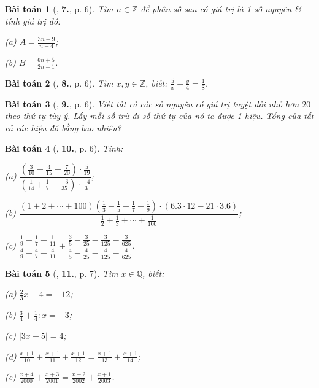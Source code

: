 \documentclass{article}
\numberwithin{equation}{section}
\newtheorem{baitoan}{Bài toán}[section]
\begin{document}
\begin{baitoan}[\cite{Binh_Toan_7_tap_1}, \textbf{7.}, p. 6]
	Tìm $n\in\mathbb{Z}$ để phân số sau có giá trị là 1 số nguyên \& tính giá trị đó:
	\begin{enumerate*}
		\item[(a)] $A = \frac{3n + 9}{n - 4}$;
		\item[(b)] $B = \frac{6n + 5}{2n - 1}$.
	\end{enumerate*}
\end{baitoan}

\begin{baitoan}[\cite{Binh_Toan_7_tap_1}, \textbf{8.}, p. 6]
	Tìm $x,y\in\mathbb{Z}$, biết: $\frac{5}{x} + \frac{y}{4} = \frac{1}{8}$.
\end{baitoan}

\begin{baitoan}[\cite{Binh_Toan_7_tap_1}, \textbf{9.}, p. 6]
	Viết tất cả các số nguyên có giá trị tuyệt đối nhỏ hơn $20$ theo thứ tự tùy ý. Lấy mỗi số trừ đi số thứ tự của nó ta được 1 hiệu. Tổng của tất cả các hiệu đó bằng bao nhiêu?
\end{baitoan}

\begin{baitoan}[\cite{Binh_Toan_7_tap_1},  \textbf{10.}, p. 6]
	Tính:
	\begin{enumerate*}
		\item[(a)] $\dfrac{\left(\frac{3}{10} - \frac{4}{15} - \frac{7}{20}\right)\cdot\frac{5}{19}}{\left(\frac{1}{14} + \frac{1}{7} - \frac{-3}{35}\right)\cdot\frac{-4}{3}}$;
		\item[(b)] $\dfrac{(1 + 2 + \cdots + 100)\left(\frac{1}{3} - \frac{1}{5} - \frac{1}{7} - \frac{1}{9}\right)\cdot(6.3\cdot 12 - 21\cdot 3.6)}{\frac{1}{2} + \frac{1}{3} + \cdots + \frac{1}{100}}$;
		\item[(c)] $\dfrac{\frac{1}{9} - \frac{1}{7} - \frac{1}{11}}{\frac{4}{9} - \frac{4}{7} - \frac{4}{11}} + \dfrac{\frac{3}{5} - \frac{3}{25} - \frac{3}{125} - \frac{3}{625}}{\frac{4}{5} - \frac{4}{25} - \frac{4}{125} - \frac{4}{625}}$.
	\end{enumerate*}
\end{baitoan}

\begin{baitoan}[\cite{Binh_Toan_7_tap_1}, \textbf{11.}, p. 7]
	Tìm $x\in\mathbb{Q}$, biết:
	\begin{enumerate*}
		\item[(a)] $\frac{2}{3}x - 4 = -12$;
		\item[(b)] $\frac{3}{4} + \frac{1}{4}:x = -3$;
		\item[(c)] $|3x - 5| = 4$;
		\item[(d)] $\frac{x + 1}{10} + \frac{x + 1}{11} + \frac{x + 1}{12} = \frac{x + 1}{13} + \frac{x + 1}{14}$;
		\item[(e)] $\frac{x + 4}{2000} + \frac{x + 3}{2001} = \frac{x + 2}{2002} + \frac{x + 1}{2003}$.
	\end{enumerate*}
\end{baitoan}
\end{document}
